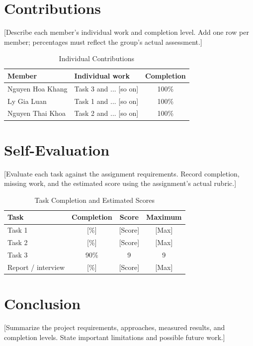 \documentclass[conference]{IEEEtran}
\begin{document}
\section{Contributions}
 [Describe each member's individual work and completion level. Add one row per
  member; percentages must reflect the group's actual assessment.]

\begin{table}[htbp]
    \caption{Individual Contributions}
    \label{tab:contributions}
    \centering
    \begin{tabular}{p{}p{}c}
        \hline
        Member             & Individual work        & Completion \\
        \hline
        {Nguyen Hoa Khang} & Task 3 and ... [so on] & 100\%      \\
        {Ly Gia Luan}      & Task 1 and ... [so on] & 100\%      \\
        {Nguyen Thai Khoa} & Task 2 and ... [so on] & 100\%      \\
        \hline
    \end{tabular}
\end{table}

\section{Self-Evaluation}
 [Evaluate each task against the assignment requirements. Record completion,
  missing work, and the estimated score using the assignment's actual rubric.]

\begin{table}[htbp]
    \caption{Task Completion and Estimated Scores}
    \label{tab:evaluation}
    \centering
    \begin{tabular}{lccc}
        \hline
        Task               & Completion & Score   & Maximum \\
        \hline
        Task 1             & [\%]       & [Score] & [Max]   \\
        Task 2             & [\%]       & [Score] & [Max]   \\
        Task 3             & 90\%       & 9       & 9       \\
        Report / interview & [\%]       & [Score] & [Max]   \\
        \hline
    \end{tabular}
\end{table}

\section{Conclusion}
 [Summarize the project requirements, approaches, measured results, and
  completion levels. State important limitations and possible future work.]
\end{document}
